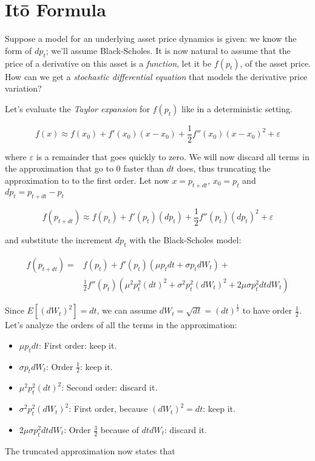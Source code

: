 \documentclass[oneside,titlepage,headinclude,12pt,a4paper,BCOR5mm,footinclude]{book}
\theoremstyle{defn}
\begin{document}
\section{It\=o Formula}

Suppose a model for  an underlying asset price dynamics is  given: we know the
form of $dp_t$;  we'll assume Black-Scholes. It is now  natural to assume that
the price  of a  derivative on this  asset is a  \textit{function}, let  it be
$f(p_t)$, of the asset price. How can we get a \textit{stochastic differential
equation} that models the derivative price variation?

Let's evaluate the \textit{Taylor expansion} for $f(p_t)$ like in a deterministic setting.

\[
  f(x) \approx f(x_0) + f'(x_0)(x-x_0) + \frac{1}{2} f''(x_0)(x-x_0)^2 + \varepsilon
\]

where $\varepsilon$  is a  remainder that  goes quickly to  zero. We  will now
discard all  terms in the  approximation that go to  0 faster than  $dt$ does,
thus truncating the approximation to to the first order. Let now $x=p_{t+dt}$,
$x_0 = p_t$ and $dp_t = p_{t+dt} - p_t$

\[
  f(p_{t+dt}) \approx f(p_t) + f'(p_t)(dp_t) + \frac{1}{2} f''(p_t)(dp_t)^2 + \varepsilon
\]

and substitute the increment $dp_t$ with the Black-Scholes model:

\begin{align*}
  f(p_{t+dt}) = & f(p_t) + f'(p_t)(\mu p_t dt + \sigma p_t dW_t) +\\ 
                & \frac{1}{2}f''(p_t)(\mu^2 p_t^2 (dt)^2 + \sigma^2 p_t^2 (dW_t)^2 + 2 \mu \sigma p_t^2 dtdW_t) 
\end{align*}

Since $E[(dW_t)^2] = dt$, we can  assume $dW_t = \sqrt{dt} = (dt)^\frac{1}{2}$
to have order $\frac{1}{2}$. Let's analyze the  orders of all the terms in the
approximation:
\begin{itemize}
  \item $\mu p_t dt$: First order: keep it.
  \item $\sigma p_t dW_t$: Order $\frac{1}{2}$: keep it.
  \item $\mu^2 p_t^2 (dt)^2$: Second order: discard it.
  \item $\sigma^2 p_t^2 (dW_t)^2$: First order, because $(dW_t)^2 = dt$: keep it.
  \item $2 \mu \sigma p_t^2 dtdW_t$: Order $\frac{3}{2}$ because of $dtdW_t$: discard it.
\end{itemize}
The truncated approximation now states that
\end{document}
